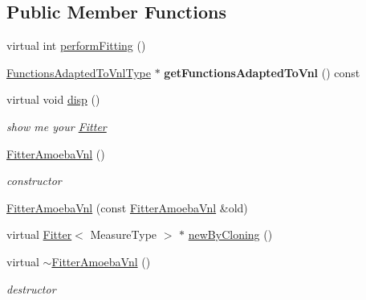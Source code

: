 \subsection*{Public Member Functions}
\begin{DoxyCompactItemize}
\item 
virtual int \hyperlink{class_ox_1_1_fitter_amoeba_vnl_a0c198974c2a95d0eb35cfe4c838e516c}{perform\-Fitting} ()
\item 
\hypertarget{class_ox_1_1_fitter_amoeba_vnl_a535465acadc24ac91302707f0ca60af2}{\hyperlink{class_ox_1_1_functions_t1_adapter_vnl_cost}{Functions\-Adapted\-To\-Vnl\-Type} $\ast$ {\bfseries get\-Functions\-Adapted\-To\-Vnl} () const }\label{class_ox_1_1_fitter_amoeba_vnl_a535465acadc24ac91302707f0ca60af2}

\item 
\hypertarget{class_ox_1_1_fitter_amoeba_vnl_ad779b5917e426add15c5a46e4dc6bfa8}{virtual void \hyperlink{class_ox_1_1_fitter_amoeba_vnl_ad779b5917e426add15c5a46e4dc6bfa8}{disp} ()}\label{class_ox_1_1_fitter_amoeba_vnl_ad779b5917e426add15c5a46e4dc6bfa8}

\begin{DoxyCompactList}\small\item\em show me your \hyperlink{class_ox_1_1_fitter}{Fitter} \end{DoxyCompactList}\item 
\hypertarget{class_ox_1_1_fitter_amoeba_vnl_af88c09a381c612c9027df9ce6b482ce2}{\hyperlink{class_ox_1_1_fitter_amoeba_vnl_af88c09a381c612c9027df9ce6b482ce2}{Fitter\-Amoeba\-Vnl} ()}\label{class_ox_1_1_fitter_amoeba_vnl_af88c09a381c612c9027df9ce6b482ce2}

\begin{DoxyCompactList}\small\item\em constructor \end{DoxyCompactList}\item 
\hyperlink{class_ox_1_1_fitter_amoeba_vnl_ac93c349cbfe52c39de9de09032286ac2}{Fitter\-Amoeba\-Vnl} (const \hyperlink{class_ox_1_1_fitter_amoeba_vnl}{Fitter\-Amoeba\-Vnl} \&old)
\item 
virtual \hyperlink{class_ox_1_1_fitter}{Fitter}$<$ Measure\-Type $>$ $\ast$ \hyperlink{class_ox_1_1_fitter_amoeba_vnl_a4c0c209a5006908c027c5a859b63b385}{new\-By\-Cloning} ()
\item 
\hypertarget{class_ox_1_1_fitter_amoeba_vnl_a80f876905cc4f5019dbbcfdbec257f79}{virtual \hyperlink{class_ox_1_1_fitter_amoeba_vnl_a80f876905cc4f5019dbbcfdbec257f79}{$\sim$\-Fitter\-Amoeba\-Vnl} ()}\label{class_ox_1_1_fitter_amoeba_vnl_a80f876905cc4f5019dbbcfdbec257f79}

\begin{DoxyCompactList}\small\item\em destructor \end{DoxyCompactList}\end{DoxyCompactItemize}

